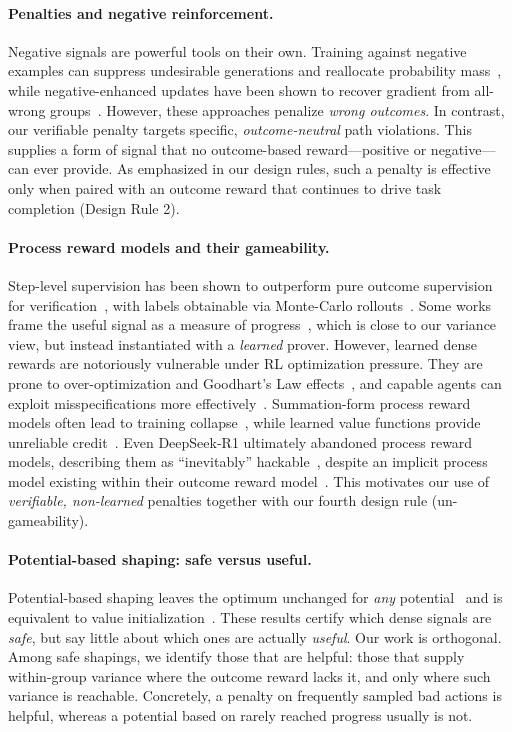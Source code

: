 \paragraph{Penalties and negative reinforcement.} Negative signals are powerful tools on their own. Training against negative examples can suppress undesirable generations and reallocate probability mass~\citep{nsr}, while negative-enhanced updates have been shown to recover gradient from all-wrong groups~\citep{ngrpo}. However, these approaches penalize \emph{wrong outcomes}. In contrast, our verifiable penalty targets specific, \emph{outcome-neutral} path violations. This supplies a form of signal that no outcome-based reward---positive or negative---can ever provide. As emphasized in our design rules, such a penalty is effective only when paired with an outcome reward that continues to drive task completion (Design Rule 2).

\paragraph{Process reward models and their gameability.} Step-level supervision has been shown to outperform pure outcome supervision for verification~\citep{prm}, with labels obtainable via Monte-Carlo rollouts~\citep{mathshepherd}. Some works frame the useful signal as a measure of progress~\citet{setlurprogress}, which is close to our variance view, but instead instantiated with a \emph{learned} prover. However, learned dense rewards are notoriously vulnerable under RL optimization pressure. They are prone to over-optimization and Goodhart's Law effects~\citep{overopt}, and capable agents can exploit misspecifications more effectively~\citep{misspec}. Summation-form process reward models often lead to training collapse~\citep{pure}, while learned value functions provide unreliable credit~\citep{vineppo}. Even DeepSeek-R1 ultimately abandoned process reward models, describing them as ``inevitably'' hackable~\citep{deepseekr1}, despite an implicit process model existing within their outcome reward model~\citep{freeprm}. This motivates our use of \emph{verifiable, non-learned} penalties together with our fourth design rule (un-gameability).

\paragraph{Potential-based shaping: safe versus useful.} Potential-based shaping leaves the optimum unchanged for \emph{any} potential~\citep{ng1999} and is equivalent to value initialization~\citep{wiewiora2003}. These results certify which dense signals are \emph{safe}, but say little about which ones are actually \emph{useful}. Our work is orthogonal. Among safe shapings, we identify those that are helpful: those that supply within-group variance where the outcome reward lacks it, and only where such variance is reachable. Concretely, a penalty on frequently sampled bad actions is helpful, whereas a potential based on rarely reached progress usually is not.

